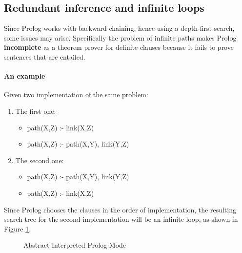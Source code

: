 \documentclass[10pt,a4paper]{article}
\begin{document}
\begin{itemize}
\subsection{Redundant inference and infinite loops}
Since Prolog works with backward chaining, hence using a depth-first search, some issues may arise. Specifically the problem of infinite paths makes Prolog \textbf{incomplete} as a theorem prover for definite clauses because it fails to prove sentences that are entailed. 

\paragraph{An example}
Given two implementation of the same problem:
\begin{enumerate}
\item The first one:
	\begin{itemize}
	\item path(X,Z) :- link(X,Z)
	\item path(X,Z) :- path(X,Y), link(Y,Z)
	\end{itemize}
\item The second one:
	\begin{itemize}
	\item path(X,Z) :- path(X,Y), link(Y,Z)
	\item path(X,Z) :- link(X,Z)
	\end{itemize}
\end{enumerate}

Since Prolog chooses the clauses in the order of implementation, the resulting search tree for the second implementation will be an infinite loop, as shown in Figure \ref{fig:prolog_tree}.


\begin{figure}[H]
\centering
{}
\caption{Abstract Interpreted Prolog Mode}
\label{fig:prolog_tree}
\end{figure}


\end{itemize}
\end{document}

